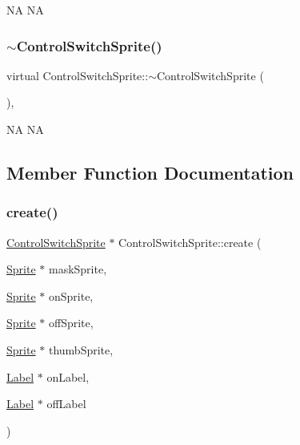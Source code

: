 NA  NA \mbox{\label{classControlSwitchSprite_a74532e265961ec91ab495a0c2c78a81d}} 
\subsubsection{\texorpdfstring{$\sim$\+Control\+Switch\+Sprite()}{~ControlSwitchSprite()}\hspace{0.1cm}{\footnotesize\ttfamily [2/2]}}
{\footnotesize\ttfamily virtual Control\+Switch\+Sprite\+::$\sim$\+Control\+Switch\+Sprite (\begin{DoxyParamCaption}{ }\end{DoxyParamCaption})\hspace{0.3cm}{\ttfamily [protected]}, {\ttfamily [virtual]}}

NA  NA 

\subsection{Member Function Documentation}
\mbox{\label{classControlSwitchSprite_a6acad0c53ee5f91dd2cf51fb2754dd92}} 
\subsubsection{\texorpdfstring{create()}{create()}\hspace{0.1cm}{\footnotesize\ttfamily [1/2]}}
{\footnotesize\ttfamily \hyperlink{classControlSwitchSprite}{Control\+Switch\+Sprite} $\ast$ Control\+Switch\+Sprite\+::create (\begin{DoxyParamCaption}\item[{\hyperlink{classSprite}{Sprite} $\ast$}]{mask\+Sprite,  }\item[{\hyperlink{classSprite}{Sprite} $\ast$}]{on\+Sprite,  }\item[{\hyperlink{classSprite}{Sprite} $\ast$}]{off\+Sprite,  }\item[{\hyperlink{classSprite}{Sprite} $\ast$}]{thumb\+Sprite,  }\item[{\hyperlink{classLabel}{Label} $\ast$}]{on\+Label,  }\item[{\hyperlink{classLabel}{Label} $\ast$}]{off\+Label }\end{DoxyParamCaption})\hspace{0.3cm}{\ttfamily [static]}}

